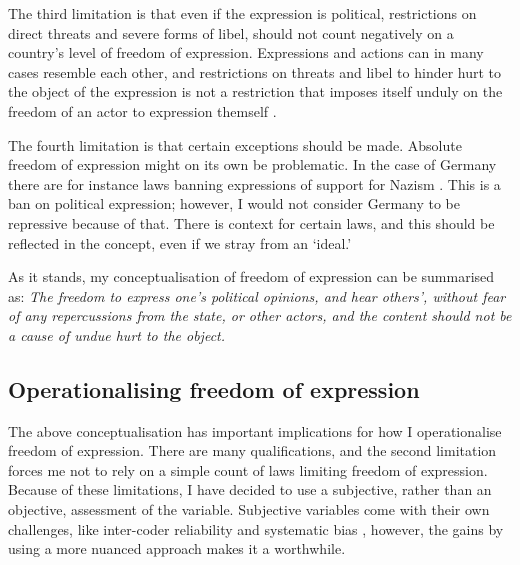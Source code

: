 The third limitation is that even if the expression is political, restrictions on direct threats and severe forms of libel, should not count negatively on a country's level of freedom of expression. Expressions and actions can in many cases resemble each other, and restrictions on threats and libel to hinder hurt to the object of the expression is not a restriction that imposes itself unduly on the freedom of an actor to expression themself \citep[pp. 81-82]{mill_liberty_2010}. 

The fourth limitation is that certain exceptions should be made. Absolute freedom of expression might on its own be problematic. In the case of Germany there are for instance laws banning expressions of support for Nazism \citep[p. 103]{bhagwat_freedom_2021}. This is a ban on political expression; however, I would not consider Germany to be repressive because of that. There is context for certain laws, and this should be reflected in the concept, even if we stray from an `ideal.'  

As it stands, my conceptualisation of freedom of expression can be summarised as: \textit{The freedom to express one's  political opinions, and hear others',  without fear of any repercussions from the state, or other actors, and the content should not be a cause of undue hurt to the object.}

\subsection{Operationalising freedom of expression}
The above conceptualisation has important implications for how I operationalise freedom of expression. There are many qualifications, and the second limitation forces me not to rely on a simple count of laws limiting freedom of expression. Because of these limitations, I have decided to use a subjective, rather than an objective, assessment of the variable. Subjective variables come with their own challenges, like inter-coder reliability and systematic bias \citep[for a discussion see:][]{little_measuring_2024, miller_how_2024}, however, the gains by using a more nuanced approach makes it a worthwhile.


